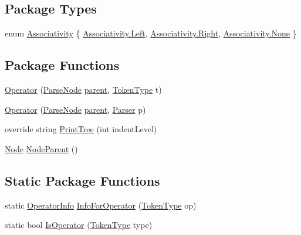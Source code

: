 \subsection*{Package Types}
\begin{DoxyCompactItemize}
\item 
enum \hyperlink{a00072_a83fa1b8db0e6678006920812b6f33f62}{Associativity} \{ \hyperlink{a00072_a83fa1b8db0e6678006920812b6f33f62a945d5e233cf7d6240f6b783b36a374ff}{Associativity.\-Left}, 
\hyperlink{a00072_a83fa1b8db0e6678006920812b6f33f62a92b09c7c48c520c3c55e497875da437c}{Associativity.\-Right}, 
\hyperlink{a00072_a83fa1b8db0e6678006920812b6f33f62a6adf97f83acf6453d4a6a4b1070f3754}{Associativity.\-None}
 \}
\end{DoxyCompactItemize}
\subsection*{Package Functions}
\begin{DoxyCompactItemize}
\item 
\hyperlink{a00072_a91a9fcc02c55cbc107fe2687fc0f05d4}{Operator} (\hyperlink{a00077}{Parse\-Node} \hyperlink{a00077_af313a82103fcc2ff5a177dbb06b92f7b}{parent}, \hyperlink{a00040_a301aa7c866593a5b625a8fc158bbeace}{Token\-Type} t)
\item 
\hyperlink{a00072_a50f9f95cd7aefe2a601a7d5b5ee7801a}{Operator} (\hyperlink{a00077}{Parse\-Node} \hyperlink{a00077_af313a82103fcc2ff5a177dbb06b92f7b}{parent}, \hyperlink{a00078}{Parser} p)
\item 
override string \hyperlink{a00072_a0c2ad7c4d6837ffc7b5325bbb8330c51}{Print\-Tree} (int indent\-Level)
\item 
\hyperlink{a00068}{Node} \hyperlink{a00077_a580e520a29444fc23ac3660cbe514a09}{Node\-Parent} ()
\end{DoxyCompactItemize}
\subsection*{Static Package Functions}
\begin{DoxyCompactItemize}
\item 
static \hyperlink{a00073}{Operator\-Info} \hyperlink{a00072_a871e7b4652c48f456647d3950ac37531}{Info\-For\-Operator} (\hyperlink{a00040_a301aa7c866593a5b625a8fc158bbeace}{Token\-Type} op)
\item 
static bool \hyperlink{a00072_a77a9edf71f86263e1695869e69505007}{Is\-Operator} (\hyperlink{a00040_a301aa7c866593a5b625a8fc158bbeace}{Token\-Type} type)
\end{DoxyCompactItemize}
